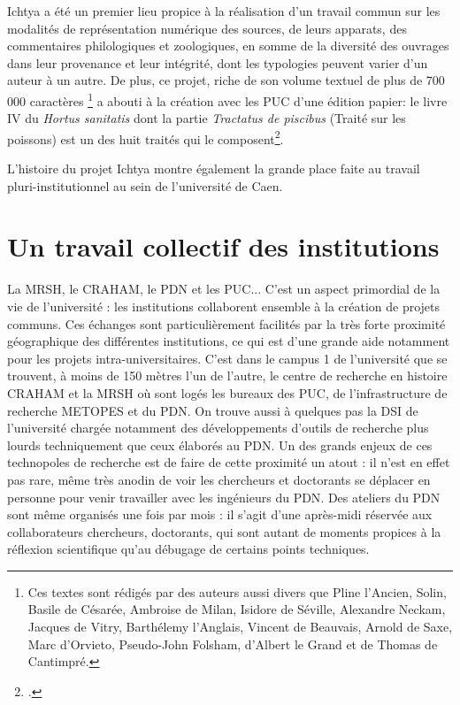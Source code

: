 \documentclass[a4paper,12pt,twoside]{book}
\begin{document}
   Ichtya a été un premier lieu propice à la réalisation d'un travail commun sur les modalités de représentation numérique des sources, de leurs apparats, des commentaires philologiques et zoologiques, en somme de la diversité des ouvrages dans leur provenance et leur intégrité, dont les typologies peuvent varier d'un auteur à un autre. De plus, ce projet, riche de son volume textuel de plus de 700 000 caractères \footnote{Ces textes sont rédigés par des auteurs aussi divers que Pline l'Ancien, Solin, Basile de Césarée, Ambroise de Milan, Isidore de Séville, Alexandre Neckam, Jacques de Vitry, Barthélemy l'Anglais, Vincent de Beauvais, Arnold de Saxe, Marc d'Orvieto, Pseudo-John Folsham, d'Albert le Grand et de Thomas de Cantimpré.} a abouti à la création avec les \acrfull{PUC} d'une édition papier: le livre IV du \textit{Hortus sanitatis} dont la partie \textit{Tractatus de piscibus} (Traité sur les poissons) est un des huit traités qui le composent\footcite{noauthor_piscibus_nodate}. 
   
   L'histoire du projet Ichtya montre également la grande place faite au travail pluri-institutionnel au sein de l'université de Caen.
    
\chapter{Un travail collectif des institutions}
    La \acrshort{MRSH}, le \acrshort{CRAHAM}, le \acrshort{PDN} et les \acrshort{PUC}... C'est un aspect primordial de la vie de l'université : les institutions collaborent ensemble à la création de projets communs. Ces échanges sont particulièrement facilités par la très forte proximité géographique des différentes institutions, ce qui est d'une grande aide notamment pour les projets intra-universitaires. C'est dans le campus 1 de l'université que se trouvent, à moins de 150 mètres l'un de l'autre, le centre de recherche en histoire \acrshort{CRAHAM} et la \acrshort{MRSH} où sont logés les bureaux des \acrfull{PUC}, de l'infrastructure de recherche \acrshort{METOPES} et du \acrlong{PDN}. On trouve aussi à quelques pas la \acrfull{DSI} de l'université chargée notamment des développements d'outils de recherche plus lourds techniquement que ceux élaborés au \acrshort{PDN}. Un des grands enjeux de ces \og technopoles \fg{} de recherche est de faire de cette proximité un atout : il n'est en effet pas rare, même très anodin de voir les chercheurs et doctorants se déplacer en personne pour venir travailler avec les ingénieurs du \acrshort{PDN}. Des \og ateliers du \acrshort{PDN}\fg{} sont même organisés une fois par mois : il s'agit d'une après-midi réservée aux collaborateurs chercheurs, doctorants, qui sont autant de moments propices à la réflexion scientifique qu'au débugage de certains points techniques. 
    
\end{document}
